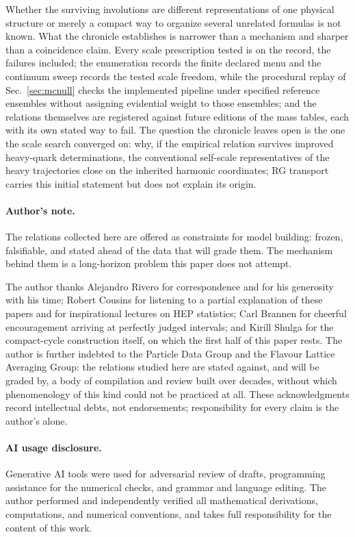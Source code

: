 \documentclass[aps,twocolumn,superscriptaddress,nofootinbib,floatfix]{revtex4-2}
\begin{document}
Whether the surviving involutions are different representations of one physical structure or merely a compact way to organize several unrelated formulas is not known. What the chronicle establishes is narrower than a mechanism and sharper than a coincidence claim. Every scale prescription tested is on the record, the failures included; the enumeration records the finite declared menu and the continuum sweep records the tested scale freedom, while the procedural replay of Sec.~\ref{sec:mcnull} checks the implemented pipeline under specified reference ensembles without assigning evidential weight to those ensembles; and the relations themselves are registered against future editions of the mass tables, each with its own stated way to fail. The question the chronicle leaves open is the one the scale search converged on: why, if the empirical relation survives improved heavy-quark determinations, the conventional self-scale representatives of the heavy trajectories close on the inherited harmonic coordinates; RG transport carries this initial statement but does not explain its origin.

\paragraph{Author's note.}
The relations collected here are offered as constraints for model building: frozen, falsifiable, and stated ahead of the data that will grade them. The mechanism behind them is a long-horizon problem this paper does not attempt.

\acknowledgments
The author thanks Alejandro Rivero for correspondence and for his generosity
with his time; Robert Cousins for listening to a partial explanation of
these papers and for inspirational lectures on HEP statistics; Carl Brannen for
cheerful encouragement arriving at perfectly judged intervals; and Kirill
Shulga for the compact-cycle construction itself, on which the first half of
this paper rests. The author is further indebted to the Particle Data Group and
the Flavour Lattice Averaging Group: the relations studied here are stated
against, and will be graded by, a body of compilation and review built over
decades, without which phenomenology of this kind could not be practiced at
all. These acknowledgments record intellectual debts, not endorsements;
responsibility for every claim is the author's alone.

\paragraph{AI usage disclosure.}
Generative AI tools were used for adversarial review of drafts, programming assistance for the numerical checks, and grammar and language editing. The author performed and independently verified all mathematical derivations, computations, and numerical conventions, and takes full responsibility for the content of this work.
\end{document}
